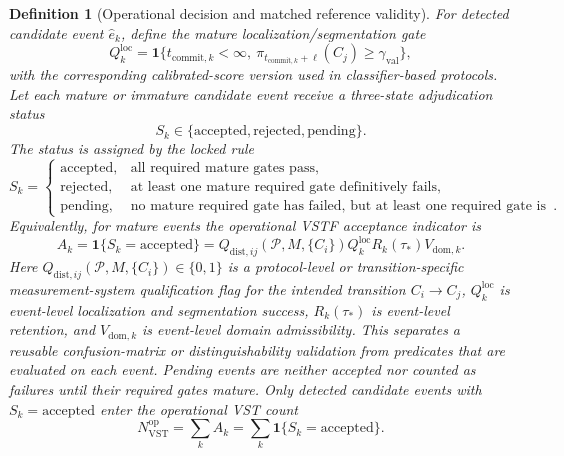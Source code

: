 \documentclass[11pt,a4paper]{article}
\newtheorem{definition}{Definition}
\newcommand{\VST}{\ensuremath{\mathrm{VST}}}
\newcommand{\1}{\mathbf{1}}
\begin{document}
\begin{definition}[Operational decision and matched reference validity]
For detected candidate event $\hat e_k$, define the mature localization/segmentation gate
\[
  Q^{\mathrm{loc}}_k
  =
  \1\{t_{\mathrm{commit},k}<\infty,\ \pi_{t_{\mathrm{commit},k}+\ell}(C_j)\geq\gamma_{\mathrm{val}}\},
\]
with the corresponding calibrated-score version used in classifier-based protocols. Let each mature or immature candidate event receive a three-state adjudication status
\[
S_k\in\{\mathrm{accepted},\mathrm{rejected},\mathrm{pending}\}.
\]
The status is assigned by the locked rule
\[
S_k =
\begin{cases}
\mathrm{accepted}, & \text{all required mature gates pass},\\
\mathrm{rejected}, & \text{at least one mature required gate definitively fails},\\
\mathrm{pending}, & \text{no mature required gate has failed, but at least one required gate is not yet mature}.
\end{cases}
\]
Equivalently, for mature events the operational VSTF acceptance indicator is
\[
  A_k=\1\{S_k=\mathrm{accepted}\} =
  Q_{\mathrm{dist},ij}(\mathcal{P},M,\{C_i\})
  Q^{\mathrm{loc}}_k
  R_k(\tau_\ast)
  V_{\mathrm{dom},k}.
\]
Here $Q_{\mathrm{dist},ij}(\mathcal{P},M,\{C_i\})\in\{0,1\}$ is a protocol-level or transition-specific measurement-system qualification flag for the intended transition $C_i\to C_j$, $Q^{\mathrm{loc}}_k$ is event-level localization and segmentation success, $R_k(\tau_\ast)$ is event-level retention, and $V_{\mathrm{dom},k}$ is event-level domain admissibility. This separates a reusable confusion-matrix or distinguishability validation from predicates that are evaluated on each event. Pending events are neither accepted nor counted as failures until their required gates mature. Only detected candidate events with $S_k=\mathrm{accepted}$ enter the operational VST count
\[
  N_{\VST}^{\mathrm{op}}=\sum_k A_k=\sum_k\1\{S_k=\mathrm{accepted}\}.
\]


\end{definition}
\end{document}

